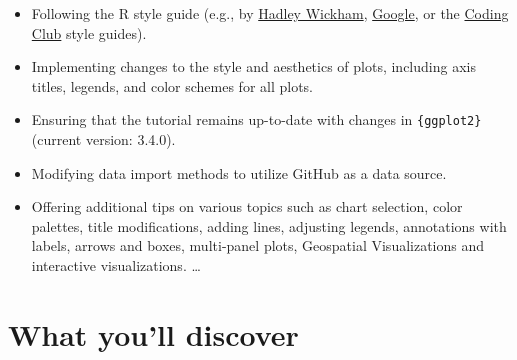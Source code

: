 \documentclass[
  letterpaper,
]{scrbook}
\providecommand{\tightlist}{%
  \setlength{\itemsep}{0pt}\setlength{\parskip}{0pt}}\usepackage{longtable,booktabs,array}
\begin{document}
\begin{itemize}
\tightlist
\item
  Following the R style guide (e.g., by
  \href{https://style.tidyverse.org}{Hadley Wickham},
  \href{https://google.github.io/styleguide/Rguide.xml}{Google}, or the
  \href{https://ourcodingclub.github.io/2017/04/25/etiquette.html\#syntax}{Coding
  Club} style guides).
\item
  Implementing changes to the style and aesthetics of plots, including
  axis titles, legends, and color schemes for all plots.
\item
  Ensuring that the tutorial remains up-to-date with changes in
  \texttt{\{ggplot2\}} (current version: 3.4.0).
\item
  Modifying data import methods to utilize GitHub as a data source.
\item
  Offering additional tips on various topics such as chart selection,
  color palettes, title modifications, adding lines, adjusting legends,
  annotations with labels, arrows and boxes, multi-panel plots,
  Geospatial Visualizations and interactive visualizations. \ldots{}
\end{itemize}

\section*{What you'll discover}\label{toc}

\end{document}
